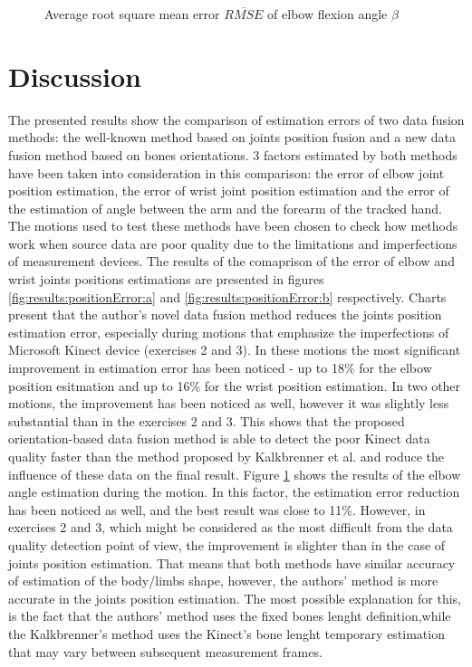 \documentclass[sensors,article,submit,moreauthors,pdftex,10pt,a4paper]{mdpi}
\begin{document}
\begin{figure}[H]
	\centering
	
	\caption{Average root square mean error $\overline{RMSE}$ of elbow flexion angle $\beta$}
	\label{fig:results:elbowAngleError}
\end{figure}

\section{Discussion}

The presented results show the comparison of estimation errors of two data fusion methods: the well-known method based on joints position fusion and a new data fusion method based on bones orientations. 3 factors estimated by both methods have been taken into consideration in this comparison: the error of elbow joint position estimation, the error of wrist joint position estimation and the error of the estimation of angle between the arm and the forearm of the tracked hand. The motions used to test these methods have been chosen to check how methods work when source data are poor quality due to the limitations and imperfections of measurement devices.
The results of the comaprison of the error of elbow and wrist joints positions estimations are presented in figures \ref{fig:results:positionError:a} and \ref{fig:results:positionError:b} respectively. Charts present that the author’s novel data fusion method reduces the joints position estimation error, especially during motions that emphasize the imperfections of Microsoft Kinect device (exercises 2 and 3). In these motions the most significant improvement in estimation error has been noticed - up to 18\% for the elbow position esitmation and up to 16\% for the wrist position estimation. In two other motions, the improvement has been noticed as well, however it was slightly less substantial than in the exercises 2 and 3. This shows that the proposed orientation-based data fusion method is able to detect the poor Kinect data quality faster than the method proposed by Kalkbrenner et al. and roduce the influence of these data on the final result. 
Figure \ref{fig:results:elbowAngleError} shows the results of the elbow angle estimation during the motion. In this factor, the estimation error reduction has been noticed as well, and the best result was close to 11\%. However, in exercises 2 and 3, which might be considered as the most difficult from the data quality detection point of view, the improvement is slighter than in the case of joints position estimation. That means that both methods have similar accuracy of estimation of the body/limbs shape, however, the authors’ method is more accurate in the joints position estimation. The most possible explanation for this, is the fact that the authors’ method uses the fixed bones lenght definition,while the Kalkbrenner’s method uses the Kinect’s bone lenght temporary estimation that may vary between subsequent measurement frames.
\end{document}
